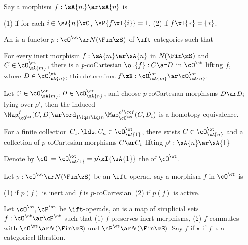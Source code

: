 \documentclass[article, a4paper, twoside]{universal}
\begin{document}
\begin{dfn}[2.1.1.8, 2.1.2.1]
    Say a morphism $f:\sA{m}\ar\sA{n}$ is

    (1)  if for each $i\in\sA{n}\xC$, $\sP{f\xI\{i\}}=1$, (2)  if $f\xI\{*\}=\{*\}$.
\end{dfn}

\begin{dfn}[2.1.1.10, 2.1.1.12]
    An  is a functor $p:\cO^{\ot}\ar N(\Fin\zS)$ of $\ift$-categories such that
    \begin{enr}[label=(\arabic*)]
        \item For every inert morphism $f:\sA{m}\ar\sA{n}$ in $N(\Fin\zS)$ and $C\in\cO^{\ot}_{\sA{m}}$, there is a $p$-coCartesian $\oL{f}:C\ar D$ in $\cO^{\ot}$ lifting $f$, where $D\in\cO^{\ot}_{\sA{n}}$, this determines $f\zE:\cO_{\sA{m}}^{\ot}\ar\cO_{\sA{n}}^{\ot}$.
        \item Let $C\in\cO_{\sA{m}}^{\ot},D\in\cO_{\sA{n}}^{\ot}$, and choose $p$-coCartesian morphisms $D\ar D_{i}$ lying over $\rho^{i}$, then the induced $\Map_{\cO^{\ot}}^{f}(C,D)\ar\prd_{1\lqs i\lqs n}\Map_{\cO^{\ot}}^{\rho^{i}\cc f}(C,D_{i})$ is a homotopy equivalence.
        \item For a finite collection $C_{1},\lds,C_{n}\in\cO_{\sA{1}}^{\ot}$, there exists $C\in\cO_{\sA{n}}^{\ot}$ and a collection of $p$-coCartesian morphisms $C\ar C_{i}$ lifting $\rho^{i}:\sA{n}\ar\sA{1}$.
    \end{enr}

    Denote by $\cO:=\cO^{\ot}_{\sA{1}}=p\xI\{\sA{1}\}$ the  of $\cO^{\ot}$.
\end{dfn}

\begin{dfn}[2.1.2.3]
    Let $p:\cO^{\ot}\ar N(\Fin\zS)$ be an $\ift$-operad, say a morphism $f$ in $\cO^{\ot}$ is

    (1)  if $p(f)$ is inert and $f$ is $p$-coCartesian, (2)  if $p(f)$ is active.
\end{dfn}

\begin{dfn}[2.1.2.7, 2.1.2.10]
    Let $\cO^{\ot},\cP^{\ot}$ be $\ift$-operads, an  is a map of simplicial sets $f:\cO^{\ot}\ar\cP^{\ot}$ such that (1) $f$ preserves inert morphisms, (2) $f$ commutes with $\cO^{\ot}\ar N(\Fin\zS)$ and $\cP^{\ot}\ar N(\Fin\zS)$. Say $f$ if a  if $f$ is a categorical fibration.
\end{dfn}
\end{document}
